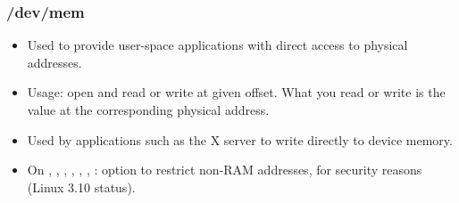 \begin{frame}
  \frametitle{/dev/mem}
  \begin{itemize}
  \item Used to provide user-space applications with direct access to
    physical addresses.
  \item Usage: open  and read or write at given offset.
    What you read or write is the value at the corresponding physical
    address.
  \item Used by applications such as the X server to write directly to
    device memory.
  \item On , , , ,
    , , :
     option to restrict 
    non-RAM addresses, for security reasons (Linux 3.10 status).
\end{itemize}
\end{frame}
